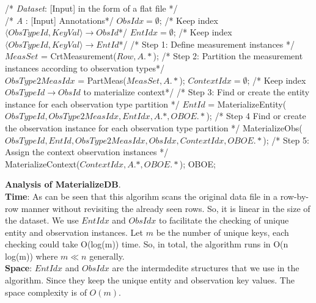 \documentclass[10pt]{article}
\begin{document}
\begin{algorithm} [htb]
\caption{{\bf MaterializeDB} ($Dataset, A.*$)}
\label{alg:matdb}
{\small
\begin{algorithmic}
\STATE /* {\em Dataset}: [Input] in the form of a flat file */\\
\STATE /* {\em A }:  [Input] Annotations*/
\STATE
\STATE $ObsIdx =\emptyset$;  /* Keep index $\langle ObsTypeId, KeyVal\rangle \rightarrow ObsId$*/
\STATE $EntIdx = \emptyset$;  /* Keep index $\langle ObsTypeId, KeyVal\rangle \rightarrow EntId$*/
\STATE
{}
    \STATE /* Step 1: Define measurement instances */\\
            $MeasSet$ = CrtMeasurement($Row, A.*$);
    \STATE
    \STATE /* Step 2: Partition the measurement instances according to observation types*/\\
        $ObsType2MeasIdx$ = PartMeas($MeasSet, A.*$);
    \STATE
    \STATE $ContextIdx = \emptyset$;  /* Keep index $ObsTypeId \rightarrow ObsId$ to materialize context*/
      \STATE /* Step 3: Find or create the entity instance for each observation type partition */
        \STATE $EntId$ = MaterializeEntity($ObsTypeId, ObsType2MeasIdx, EntIdx, A.*, OBOE.*$);
        \STATE
        \STATE /* Step 4 Find or create the observation instance for each observation type partition */
        \STATE MaterializeObs($ObsTypeId, EntId, ObsType2MeasIdx, ObsIdx, ContextIdx, OBOE.*$);
    \ENDFOR
    \STATE
    \STATE /* Step 5: Assign the context observation instances */  \\
            MaterializeContext($ContextIdx, A.*, OBOE.*$);
\ENDFOR
\RETURN OBOE;
\end{algorithmic}
}
\end{algorithm}

{\bf Analysis of MaterializeDB}. \\
{\bf Time}: As can be seen that  this algorihm scans the original data file in a row-by-row manner without revisiting the already seen rows. So, it is linear in the size of the dataset. 
 We use $EntIdx$ and $ObsIdx$ to facilitate the checking of unique entity and observation instances. Let $m$ be the number of unique keys, each checking could take O(log(m)) time. 
So, in total, the algorithm runs in O(n log(m)) where $m\ll n$ generally. \\
{\bf Space}: $EntIdx$ and $ObsIdx$ are the intermdedite structures that we use in the algorithm. Since they keep the unique entity and observation key values. The space complexity is of $O(m)$. 
\end{document}

